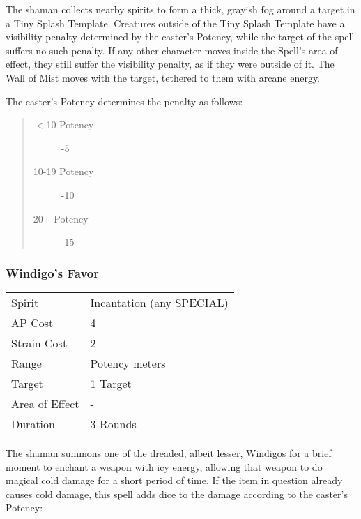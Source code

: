 \documentclass[11pt,a4paper,twocolumn]{book}
\begin{document}
\medskip

The shaman collects nearby spirits to form a thick, grayish fog around a target in a Tiny Splash Template. Creatures outside of the Tiny Splash Template have a visibility penalty determined by the caster's Potency, while the target of the spell suffers no such penalty. If any other character moves inside the Spell's area of effect, they still suffer the visibility penalty, as if they were outside of it. The Wall of Mist moves with the target, tethered to them with arcane energy.

The caster's Potency determines the penalty as follows:

\begin{quote}
	\begin{description}
		\item[$<$10 Potency] 	-5
		\item[10-19 Potency] 	-10
		\item[20+ Potency] 		-15 
	\end{description}
\end{quote}

\subsubsection*{Windigo's Favor}
{
	\begin{tabu} to 75mm{| X[l,4] | X[l,7] |}
		\hline
		Spirit         & Incantation (any SPECIAL) \\
		AP Cost        & 4                         \\
		Strain Cost    & 2                         \\
		Range          & Potency meters            \\
		Target         & 1 Target                  \\
		Area of Effect & -                         \\
		Duration       & 3 Rounds                  \\ \hline
	\end{tabu}
	
}

\medskip

The shaman summons one of the dreaded, albeit lesser, Windigos for a brief moment to enchant a weapon with icy energy, allowing that weapon to do magical cold damage for a short period of time. If the item in question already causes cold damage, this spell adds dice to the damage according to the caster's Potency:
\end{document}
